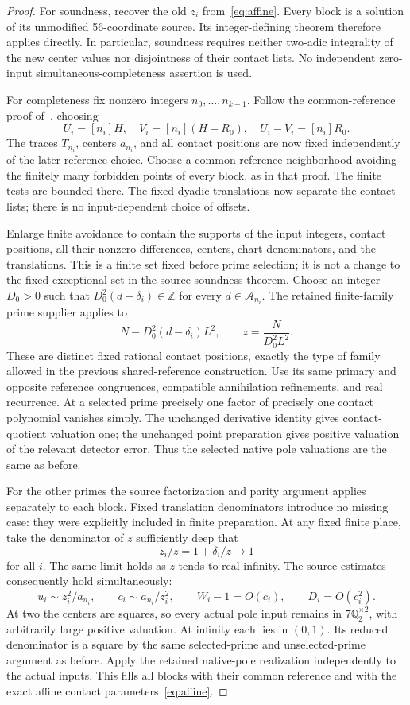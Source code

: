 \documentclass[11pt]{article}
\newcommand{\Q}{\mathbb Q}\newcommand{\Z}{\mathbb Z}
\begin{document}
\begin{proof}
For soundness, recover the old \(z_i\) from~\eqref{eq:affine}. Every
block is a solution of its unmodified 56-coordinate source. Its
integer-defining theorem therefore applies directly. In particular,
soundness requires neither two-adic integrality of the new center values
nor disjointness of their contact lists. No independent zero-input
simultaneous-completeness assertion is used.

For completeness fix nonzero integers \(n_0,\ldots,n_{k-1}\). Follow
the common-reference proof of~\cite{reference}, choosing
\[
 U_i=[n_i]H,\quad V_i=[n_i](H-R_0),\quad U_i-V_i=[n_i]R_0.
\]
The traces \(T_{n_i}\), centers \(a_{n_i}\), and all contact positions
are now fixed independently of the later reference choice. Choose a
common reference neighborhood avoiding the finitely many forbidden
points of every block, as in that proof. The finite tests are bounded
there. The fixed dyadic translations now separate the contact lists;
there is no input-dependent choice of offsets.

Enlarge finite avoidance to contain the supports of the input integers,
contact positions, all their nonzero differences, centers, chart
denominators, and the translations. This is a finite set fixed before
prime selection; it is not a change to the fixed exceptional set in
the source soundness theorem. Choose an integer \(D_0>0\) such that
\(D_0^2(d-\delta_i)\in\Z\) for every \(d\in\mathcal A_{n_i}\).
The retained finite-family prime supplier applies to
\[
 N-D_0^2(d-\delta_i)L^2,
 \qquad z=\frac{N}{D_0^2L^2}.
\]
These are distinct fixed rational contact positions, exactly the type
of family allowed in the previous shared-reference construction.
Use its same primary and opposite reference congruences, compatible
annihilation refinements, and real recurrence. At a selected prime
precisely one factor of precisely one contact polynomial vanishes
simply. The unchanged derivative identity gives contact-quotient
valuation one; the unchanged point preparation gives positive
valuation of the relevant detector error. Thus the selected native
pole valuations are the same as before.

For the other primes the source factorization and parity argument
applies separately to each block. Fixed translation denominators
introduce no missing case: they were explicitly included in finite
preparation. At any fixed finite place, take the denominator of \(z\)
sufficiently deep that
\[
                   z_i/z=1+\delta_i/z\longrightarrow1
\]
for all \(i\). The same limit holds as \(z\) tends to real infinity.
The source estimates consequently hold simultaneously:
\[
 u_i\sim z_i^2/a_{n_i},\qquad c_i\sim a_{n_i}/z_i^2,
 \qquad W_i-1=O(c_i),\qquad D_i=O(c_i^2).
\]
At two the centers are squares, so every actual pole input remains
in \(7\Q_2^{\times2}\), with arbitrarily large positive valuation.
At infinity each lies in \((0,1)\). Its reduced denominator is a
square by the same selected-prime and unselected-prime argument as
before. Apply the retained native-pole realization independently to
the actual inputs. This fills all blocks with their common reference
and with the exact affine contact parameters~\eqref{eq:affine}.


\end{proof}
\end{document}

